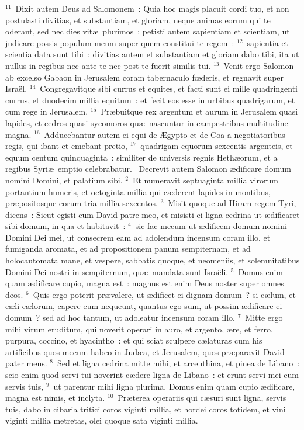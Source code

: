 ${}^{11}$~Dixit autem Deus ad Salomonem~: Quia hoc magis placuit cordi tuo, et non postulasti divitias, et substantiam, et gloriam, neque animas eorum qui te oderant, sed nec dies vit\ae\ plurimos~: petisti autem sapientiam et scientiam, ut judicare possis populum meum super quem constitui te regem~:
${}^{12}$~sapientia et scientia data sunt tibi~: divitias autem et substantiam et gloriam dabo tibi, ita ut nullus in regibus nec ante te nec post te fuerit similis tui.
${}^{13}$~Venit ergo Salomon ab excelso Gabaon in Jerusalem coram tabernaculo fœderis, et regnavit super Isra\"el.
${}^{14}$~Congregavitque sibi currus et equites, et facti sunt ei mille quadringenti currus, et duodecim millia equitum~: et fecit eos esse in urbibus quadrigarum, et cum rege in Jerusalem.
${}^{15}$~Pr\ae buitque rex argentum et aurum in Jerusalem quasi lapides, et cedros quasi sycomoros qu\ae\ nascuntur in campestribus multitudine magna.
${}^{16}$~Adducebantur autem ei equi de \AE gypto et de Coa a negotiatoribus regis, qui ibant et emebant pretio,
${}^{17}$~quadrigam equorum sexcentis argenteis, et equum centum quinquaginta~: similiter de universis regnis Heth\ae orum, et a regibus Syri\ae\ emptio celebrabatur.
~\lettrine[lines=10,image=true,loversize=0.05,lraise=-0.03]{D}{}ecrevit autem Salomon \ae dificare domum nomini Domini, et palatium sibi.
${}^{2}$~Et numeravit septuaginta millia virorum portantium humeris, et octoginta millia qui c\ae derent lapides in montibus, pr\ae positosque eorum tria millia sexcentos.
${}^{3}$~Misit quoque ad Hiram regem Tyri, dicens~: Sicut egisti cum David patre meo, et misisti ei ligna cedrina ut \ae dificaret sibi domum, in qua et habitavit~:
${}^{4}$~sic fac mecum ut \ae dificem domum nomini Domini Dei mei, ut consecrem eam ad adolendum incensum coram illo, et fumiganda aromata, et ad propositionem panum sempiternam, et ad holocautomata mane, et vespere, sabbatis quoque, et neomeniis, et solemnitatibus Domini Dei nostri in sempiternum, qu\ae\ mandata sunt Isra\"eli.
${}^{5}$~Domus enim quam \ae dificare cupio, magna est~: magnus est enim Deus noster super omnes deos.
${}^{6}$~Quis ergo poterit pr\ae valere, ut \ae dificet ei dignam domum~? si c\ae lum, et c\ae li c\ae lorum, capere eum nequeunt, quantus ego sum, ut possim \ae dificare ei domum~? sed ad hoc tantum, ut adoleatur incensum coram illo.
${}^{7}$~Mitte ergo mihi virum eruditum, qui noverit operari in auro, et argento, \ae re, et ferro, purpura, coccino, et hyacintho~: et qui sciat sculpere c\ae laturas cum his artificibus quos mecum habeo in Jud\ae a, et Jerusalem, quos pr\ae paravit David pater meus.
${}^{8}$~Sed et ligna cedrina mitte mihi, et arceuthina, et pinea de Libano~: scio enim quod servi tui noverint c\ae dere ligna de Libano~: et erunt servi mei cum servis tuis,
${}^{9}$~ut parentur mihi ligna plurima. Domus enim quam cupio \ae dificare, magna est nimis, et inclyta.
${}^{10}$~Pr\ae terea operariis qui c\ae suri sunt ligna, servis tuis, dabo in cibaria tritici coros viginti millia, et hordei coros totidem, et vini viginti millia metretas, olei quoque sata viginti millia.



